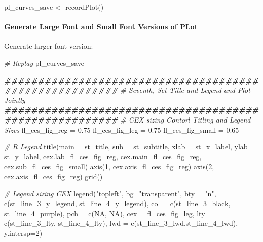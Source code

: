 \documentclass[
]{book}
\newenvironment{Shaded}{\begin{snugshade}}{\end{snugshade}}
\newcommand{\AttributeTok}[1]{\textcolor[rgb]{0.77,0.63,0.00}{#1}}
\newcommand{\CommentTok}[1]{\textcolor[rgb]{0.56,0.35,0.01}{\textit{#1}}}
\newcommand{\ConstantTok}[1]{\textcolor[rgb]{0.00,0.00,0.00}{#1}}
\newcommand{\DecValTok}[1]{\textcolor[rgb]{0.00,0.00,0.81}{#1}}
\newcommand{\DocumentationTok}[1]{\textcolor[rgb]{0.56,0.35,0.01}{\textbf{\textit{#1}}}}
\newcommand{\FloatTok}[1]{\textcolor[rgb]{0.00,0.00,0.81}{#1}}
\newcommand{\FunctionTok}[1]{\textcolor[rgb]{0.00,0.00,0.00}{#1}}
\newcommand{\NormalTok}[1]{#1}
\newcommand{\OtherTok}[1]{\textcolor[rgb]{0.56,0.35,0.01}{#1}}
\newcommand{\StringTok}[1]{\textcolor[rgb]{0.31,0.60,0.02}{#1}}
\begin{document}
\begin{Shaded}
\begin{Highlighting}[]
\NormalTok{pl\_curves\_save }\OtherTok{\textless{}{-}} \FunctionTok{recordPlot}\NormalTok{()}
\end{Highlighting}
\end{Shaded}

\hypertarget{generate-large-font-and-small-font-versions-of-plot}{%
\paragraph{Generate Large Font and Small Font Versions of PLot}\label{generate-large-font-and-small-font-versions-of-plot}}

Generate larger font version:

\begin{Shaded}
\begin{Highlighting}[]
\CommentTok{\# Replay}
\NormalTok{pl\_curves\_save}

\DocumentationTok{\#\#\#\#\#\#\#\#\#\#\#\#\#\#\#\#\#\#\#\#\#\#\#\#\#\#\#\#\#\#\#\#\#\#\#\#\#\#\#\#\#\#\#\#\#\#\#\#\#\#\#\#\#\#\#}
\CommentTok{\# Seventh, Set Title and Legend and Plot Jointly}
\DocumentationTok{\#\#\#\#\#\#\#\#\#\#\#\#\#\#\#\#\#\#\#\#\#\#\#\#\#\#\#\#\#\#\#\#\#\#\#\#\#\#\#\#\#\#\#\#\#\#\#\#\#\#\#\#\#\#\#}
\CommentTok{\# CEX sizing Contorl Titling and Legend Sizes}
\NormalTok{fl\_ces\_fig\_reg }\OtherTok{=} \FloatTok{0.75}
\NormalTok{fl\_ces\_fig\_leg }\OtherTok{=} \FloatTok{0.75}
\NormalTok{fl\_ces\_fig\_small }\OtherTok{=} \FloatTok{0.65}

\CommentTok{\# R Legend}
\FunctionTok{title}\NormalTok{(}\AttributeTok{main =}\NormalTok{ st\_title, }\AttributeTok{sub =}\NormalTok{ st\_subtitle, }\AttributeTok{xlab =}\NormalTok{ st\_x\_label, }\AttributeTok{ylab =}\NormalTok{ st\_y\_label,}
      \AttributeTok{cex.lab=}\NormalTok{fl\_ces\_fig\_reg,}
      \AttributeTok{cex.main=}\NormalTok{fl\_ces\_fig\_reg,}
      \AttributeTok{cex.sub=}\NormalTok{fl\_ces\_fig\_small)}
\FunctionTok{axis}\NormalTok{(}\DecValTok{1}\NormalTok{, }\AttributeTok{cex.axis=}\NormalTok{fl\_ces\_fig\_reg)}
\FunctionTok{axis}\NormalTok{(}\DecValTok{2}\NormalTok{, }\AttributeTok{cex.axis=}\NormalTok{fl\_ces\_fig\_reg)}
\FunctionTok{grid}\NormalTok{()}

\CommentTok{\# Legend sizing CEX}
\FunctionTok{legend}\NormalTok{(}\StringTok{"topleft"}\NormalTok{,}
       \AttributeTok{bg=}\StringTok{"transparent"}\NormalTok{,}
       \AttributeTok{bty =} \StringTok{"n"}\NormalTok{,}
       \FunctionTok{c}\NormalTok{(st\_line\_3\_y\_legend, st\_line\_4\_y\_legend),}
       \AttributeTok{col =} \FunctionTok{c}\NormalTok{(st\_line\_3\_black, st\_line\_4\_purple),}
       \AttributeTok{pch =} \FunctionTok{c}\NormalTok{(}\ConstantTok{NA}\NormalTok{, }\ConstantTok{NA}\NormalTok{),}
       \AttributeTok{cex =}\NormalTok{ fl\_ces\_fig\_leg,}
       \AttributeTok{lty =} \FunctionTok{c}\NormalTok{(st\_line\_3\_lty, st\_line\_4\_lty),}
       \AttributeTok{lwd =} \FunctionTok{c}\NormalTok{(st\_line\_3\_lwd,st\_line\_4\_lwd),}
       \AttributeTok{y.intersp=}\DecValTok{2}\NormalTok{)}
\end{Highlighting}
\end{Shaded}
\end{document}
